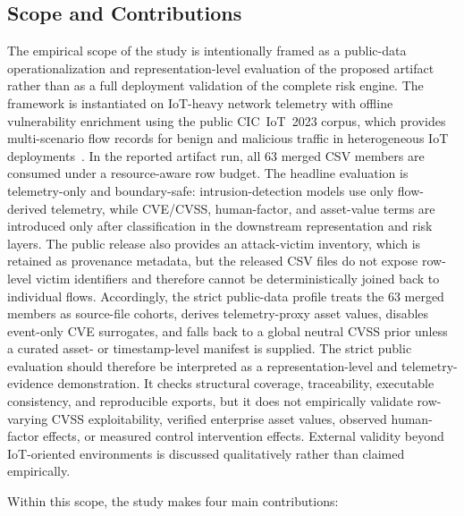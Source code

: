 \documentclass[preprint,12pt]{elsarticle}
\begin{document}
\subsection{Scope and Contributions}
\label{sec:intro-gap}

The empirical scope of the study is intentionally framed as a public-data operationalization and representation-level evaluation of the proposed artifact rather than as a full deployment validation of the complete risk engine. The framework is instantiated on IoT-heavy network telemetry with offline vulnerability enrichment using the public CIC~IoT~2023 corpus, which provides multi-scenario flow records for benign and malicious traffic in heterogeneous IoT deployments~\cite{Neto2023_CICIoT2023,CICIoT2023_Web}. In the reported artifact run, all 63 merged CSV members are consumed under a resource-aware row budget. The headline evaluation is telemetry-only and boundary-safe: intrusion-detection models use only flow-derived telemetry, while CVE/CVSS, human-factor, and asset-value terms are introduced only after classification in the downstream representation and risk layers. The public release also provides an attack-victim inventory, which is retained as provenance metadata, but the released CSV files do not expose row-level victim identifiers and therefore cannot be deterministically joined back to individual flows. Accordingly, the strict public-data profile treats the 63 merged members as source-file cohorts, derives telemetry-proxy asset values, disables event-only CVE surrogates, and falls back to a global neutral CVSS prior unless a curated asset- or timestamp-level manifest is supplied. The strict public evaluation should therefore be interpreted as a representation-level and telemetry-evidence demonstration. It checks structural coverage, traceability, executable consistency, and reproducible exports, but it does not empirically validate row-varying CVSS exploitability, verified enterprise asset values, observed human-factor effects, or measured control intervention effects. External validity beyond IoT-oriented environments is discussed qualitatively rather than claimed empirically.

Within this scope, the study makes four main contributions:
\end{document}
